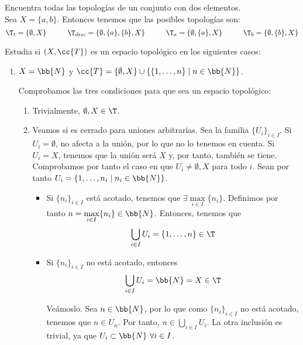 \begin{ejercicio}
    Encuentra todas las topologías de un conjunto con dos elementos.\\

    Sea $X=\{a,b\}$. Entonces tenemos que las posibles topologías son:
    \begin{equation*}
        \T_t = \{\emptyset, X\}
        \hspace{1cm} \T_{disc} = \{\emptyset, \{a\}, \{b\}, X\}
        \hspace{1cm} \T_a = \{\emptyset, \{a\}, X\}
        \hspace{1cm} \T_b = \{\emptyset, \{b\}, X\}
    \end{equation*}
\end{ejercicio}

\begin{ejercicio}
    Estudia si $(X,\cc{T})$ es un espacio topológico en los siguientes casos:
    \begin{enumerate}[label=\alph*)]
        \item $X=\bb{N}$ y $\cc{T}=\{\emptyset, X\}\cup \left\{\{1,\dots, n\}\mid n\in \bb{N}\right\}$.

        Comprobamos las tres condiciones para que sea un espacio topológico:
        \begin{enumerate}
            \item Trivialmente, $\emptyset, X\in \T$.
            \item Veamos si es cerrado para uniones arbitrarias. Sea la familia $\{U_i\}_{i\in I}$. Si $U_i=\emptyset$, no afecta a la unión, por lo que no lo tenemos en cuenta. Si $U_i=X$, tenemos que la unión será $X$ y, por tanto, también se tiene. Comprobamos por tanto el caso en que $U_i\neq \emptyset, X$ para todo $i$. Sean por tanto $U_i=\{1,\dots, n_i\mid n_i\in \bb{N}\}$.
            \begin{itemize}
                \item Si $\{n_i\}_{i\in I}$ está acotado, tenemos que $\exists \max\limits_{i\in I}\{n_i\}$. Definimos por tanto $n=\max\limits_{i\in I}\{n_i\}\in \bb{N}$. Entonces, tenemos que
                $$\bigcup_{i\in I}U_i = \{1,\dots, n\}\in \T$$

                \item Si $\{n_i\}_{i\in I}$ no está acotado, entonces $$\bigcup_{i\in I}U_i = \bb{N}=X\in \T$$

                Veámoslo. Sea $n\in \bb{N}$, por lo que como $\{n_i\}_{i\in I}$ no está acotado, tenemos que $n\in U_n$. Por tanto, $n\in \bigcup\limits_{i\in I}U_i$. La otra inclusión es trivial, ya que $U_i\subset \bb{N}~\forall i\in I$.
            \end{itemize}


\end{enumerate}
\end{enumerate}
\end{ejercicio}
